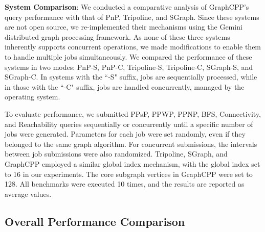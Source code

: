 \documentclass[lettersize,journal]{IEEEtran} %
\begin{document}
{\bf{System Comparison}}: We conducted a comparative analysis of GraphCPP's query performance with that of PnP, Tripoline, and SGraph. Since these systems are not open source, we re-implemented their mechanisms using the Gemini distributed graph processing framework. As none of these three systems inherently supports concurrent operations, we made modifications to enable them to handle multiple jobs simultaneously. We compared the performance of these systems in two modes: PnP-S, PnP-C, Tripoline-S, Tripoline-C, SGraph-S, and SGraph-C. In systems with the ``-S" suffix, jobs are sequentially processed, while in those with the ``-C" suffix, jobs are handled concurrently, managed by the operating system.

To evaluate performance, we submitted PPsP, PPWP, PPNP, BFS, Connectivity, and Reachability queries sequentially or concurrently until a specific number of jobs were generated. Parameters for each job were set randomly, even if they belonged to the same graph algorithm. For concurrent submissions, the intervals between job submissions were also randomized. Tripoline, SGraph, and GraphCPP employed a similar global index mechanism, with the global index set to 16 in our experiments. The core subgraph vertices in GraphCPP were set to 128. All benchmarks were executed 10 times, and the results are reported as average values.
    

\subsection{Overall Performance Comparison}
\end{document}
